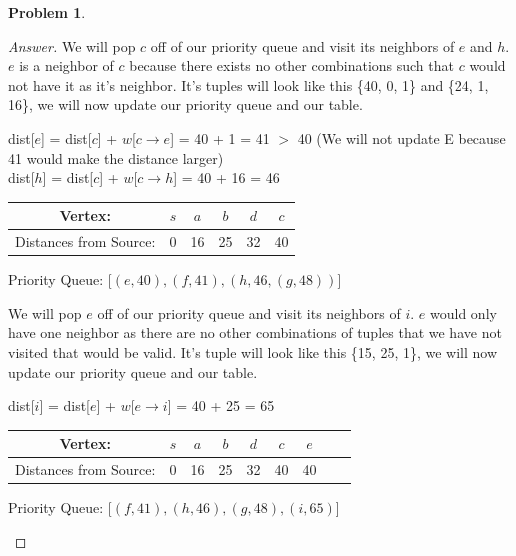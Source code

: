 \documentclass[11pt]{article}
\theoremstyle{definition}
\theoremstyle{definition}
\newtheorem{required}{Problem}
\theoremstyle{definition}
\begin{document}
\begin{required}
\begin{enumerate}[label=(\alph*)]
\begin{proof}[Answer]
We will pop $c$ off of our priority queue and visit its neighbors of $e$ and $h$. $e$ is a neighbor of $c$ because there exists no other combinations such that $c$ would not have it as it's neighbor. It's tuples will look like this \{40, 0, 1\} and \{24, 1, 16\}, we will now update our priority queue and our table.
\begin{center}
dist[$e$] = dist[$c$]  + $w$[$c \rightarrow e$] = 40 + 1 = 41 $>$ 40 (We will not update E because 41 would make the distance larger) \\
dist[$h$] = dist[$c$] + $w$[$c \rightarrow h$] = 40 + 16 = 46\\
\begin{tabular}{ | c | c | c | c | c | c |}
 \hline
 Vertex:& $s$ & $a$ & $b$ & $d$ & $c$\\ 
 \hline
 Distances from Source:& 0 & 16 & 25 & 32 & 40\\  
 \hline
\end{tabular}
\end{center}
\begin{center}
Priority Queue: [$(e, 40), (f, 41), (h, 46, (g, 48))$]
\end{center}

We will pop $e$ off of our priority queue and visit its neighbors of $i$. $e$ would only have one neighbor as there are no other combinations of tuples that we have not visited that would be valid. It's tuple will look like this \{15, 25, 1\}, we will now update our priority queue and our table.
\begin{center}
dist[$i$] = dist[$e$]  + $w$[$e \rightarrow i$] = 40 + 25 = 65 \\
\begin{tabular}{ | c | c | c | c | c | c | c | c | c |}
 \hline
 Vertex:& $s$ & $a$ & $b$ & $d$ & $c$ & $e$\\ 
 \hline
 Distances from Source:& 0 & 16 & 25 & 32 & 40 & 40\\  
 \hline
\end{tabular}
\end{center}
\begin{center}
Priority Queue: [$(f, 41), (h, 46), (g, 48), (i, 65)$]
\end{center}


\end{proof}
\end{enumerate}
\end{required}
\end{document}

